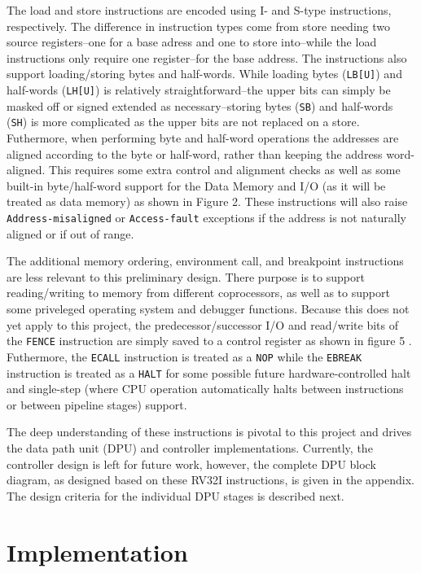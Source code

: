\documentclass[lettersize,journal]{IEEEtran}
\begin{document}
The load and store instructions are encoded using I- and S-type instructions, respectively.
The difference in instruction types come from store needing two source registers--one for a base adress and one to store into--while the load instructions only require one register--for the base address.
The instructions also support loading/storing bytes and half-words.
While loading bytes (\verb|LB[U]|) and half-words (\verb|LH[U]|) is relatively straightforward--the upper bits can simply be masked off or signed extended as necessary--storing bytes (\verb|SB|) and half-words (\verb|SH|) is more complicated as the upper bits are not replaced on a store.
Futhermore, when performing byte and half-word operations the addresses are aligned according to the byte or half-word, rather than keeping the address word-aligned.
This requires some extra control and alignment checks as well as some built-in byte/half-word support for the Data Memory and I/O (as it will be treated as data memory) as shown in Figure 2.
These instructions will also raise \verb|Address-misaligned| or \verb|Access-fault| exceptions if the address is not naturally aligned or if out of range.

The additional memory ordering, environment call, and breakpoint instructions are less relevant to this preliminary design.
There purpose is to support reading/writing to memory from different coprocessors, as well as to support some priveleged operating system and debugger functions.
Because this does not yet apply to this project, the predecessor/successor I/O and read/write bits of the \verb|FENCE| instruction are simply saved to a control register as shown in figure 5 \cite{riscvunprovisioned}.
Futhermore, the \verb|ECALL| instruction is treated as a \verb|NOP| while the \verb|EBREAK| instruction is treated as a \verb|HALT| for some possible future hardware-controlled halt and single-step (where CPU operation automatically halts between instructions or between pipeline stages) support.

The deep understanding of these instructions is pivotal to this project and drives the data path unit (DPU) and controller implementations.
Currently, the controller design is left for future work, however, the complete DPU block diagram, as designed based on these RV32I instructions, is given in the appendix.
The design criteria for the individual DPU stages is described next.

\section{Implementation}
\end{document}

